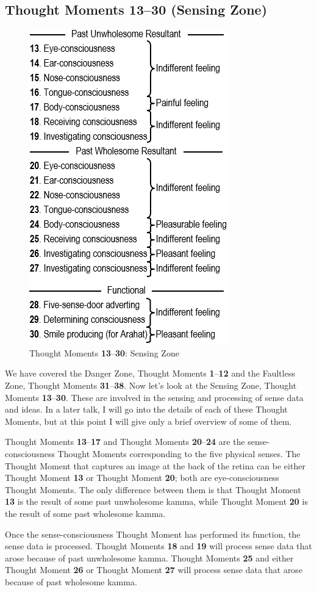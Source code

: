 \subsection*{Thought Moments 13--30 (Sensing Zone)}

\begin{figure}[h]
\centering
\includegraphics[width=0.46\linewidth]{./Diagrams/Sensing}
\caption{Thought Moments \textbf{13}--\textbf{30}: Sensing Zone}
\label{fig:Sensing}
\end{figure}

We have covered the Danger Zone, Thought Moments \textbf{1}--\textbf{12} and the Faultless Zone, Thought Moments \textbf{31}--\textbf{38}. Now let’s look at the Sensing Zone, Thought Moments \textbf{13}--\textbf{30}. These are involved in the sensing and processing of sense data and ideas. In a later talk, I will go into the details of each of these Thought Moments, but at this point I will give only a brief overview of some of them.

Thought Moments \textbf{13}--\textbf{17} and Thought Moments \textbf{20}--\textbf{24} are the sense-consciousness Thought Moments corresponding to the five physical senses. The Thought Moment that captures an image at the back of the retina can be either Thought Moment \textbf{13} or Thought Moment \textbf{20}; both are eye-consciousness Thought Moments. The only difference between them is that Thought Moment \textbf{13} is the result of some past unwholesome kamma, while Thought Moment \textbf{20} is the result of some past wholesome kamma.

Once the sense-consciousness Thought Moment has performed its function, the sense data is processed. Thought Moments \textbf{18} and \textbf{19} will process sense data that arose because of past unwholesome kamma. Thought Moments \textbf{25} and either Thought Moment \textbf{26} or Thought Moment \textbf{27} will process sense data that arose because of past wholesome kamma.

